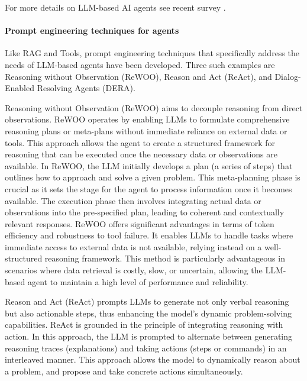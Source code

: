 \documentclass[conference]{IEEEtran}
\begin{document}
For more details on LLM-based AI agents see recent survey \cite{xi2023rise, wang2023survey, durante2024agent}. 

\paragraph{Prompt engineering techniques for agents}
Like RAG and Tools, prompt engineering techniques that specifically address the needs of LLM-based agents have been developed. Three such examples are Reasoning without Observation (ReWOO), Reason and Act (ReAct), and Dialog-Enabled Resolving Agents (DERA).

Reasoning without Observation (ReWOO) \cite{xu2023rewoo} aims to decouple reasoning from direct observations. ReWOO operates by enabling LLMs to formulate comprehensive reasoning plans or meta-plans without immediate reliance on external data or tools. This approach allows the agent to create a structured framework for reasoning that can be executed once the necessary data or observations are available. In ReWOO, the LLM initially develops a plan (a series of steps) that outlines how to approach and solve a given problem. This meta-planning phase is crucial as it sets the stage for the agent to process information once it becomes available. The execution phase then involves integrating actual data or observations into the pre-specified plan, leading to coherent and contextually relevant responses. ReWOO offers significant advantages in terms of token efficiency and robustness to tool failure. It enables LLMs to handle tasks where immediate access to external data is not available, relying instead on a well-structured reasoning framework. This method is particularly advantageous in scenarios where data retrieval is costly, slow, or uncertain, allowing the LLM-based agent to maintain a high level of performance and reliability.

Reason and Act (ReAct)\cite{yao2023react} prompts LLMs to generate not only verbal reasoning but also actionable steps, thus enhancing the model's dynamic problem-solving capabilities. ReAct is grounded in the principle of integrating reasoning with action. In this approach, the LLM is prompted to alternate between generating reasoning traces (explanations) and taking actions (steps or commands) in an interleaved manner. This approach allows the model to dynamically reason about a problem, and propose and take concrete actions simultaneously.
\end{document}
